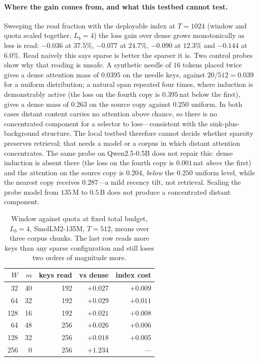 \documentclass[sigconf,nonacm,11pt]{acmart}
\begin{document}
\paragraph{Where the gain comes from, and what this testbed cannot test.} Sweeping the
read fraction with the deployable index at $T=1024$ (window and quota scaled together,
$L_b=4$) the loss gain over dense grows monotonically as less is read: $-0.036$ at
$37.5\%$, $-0.077$ at $24.7\%$, $-0.090$ at $12.3\%$ and $-0.144$ at $6.0\%$. Read
naively this says sparse is better the sparser it is. Two control probes show why that
reading is unsafe. A synthetic needle of $16$ tokens placed twice gives a dense
attention mass of $0.0395$ on the needle keys, against $20/512=0.039$ for a uniform
distribution; a natural span repeated four times, where induction is demonstrably
active (the loss on the fourth copy is $0.395$\,nat below the first), gives a dense
mass of $0.263$ on the source copy against $0.250$ uniform. In both cases distant
content carries no attention above chance, so there is no concentrated component for a
selector to lose---consistent with the sink-plus-background structure. The local
testbed therefore cannot decide whether sparsity preserves retrieval; that needs a
model or a corpus in which distant attention concentrates.
The same probe on Qwen2.5-0.5B does not repair this: dense induction is absent
there (the loss on the fourth copy is $0.001$\,nat \emph{above} the first) and the
attention on the source copy is $0.204$, \emph{below} the $0.250$ uniform level, while
the nearest copy receives $0.287$---a mild recency tilt, not retrieval. Scaling the
probe model from $135$\,M to $0.5$\,B does not produce a concentrated distant
component.

\begin{table}[t]
\centering
\caption{Window against quota at fixed total budget, $L_b=4$, SmolLM2-135M,
$T=512$, means over three corpus chunks. The last row reads more keys than any
sparse configuration and still loses two orders of magnitude more.}
\label{tab:window}
\begin{tabular}{rrrrr}
\toprule
$W$ & $m$ & keys read & vs dense & index cost \\
\midrule
32 & 40 & 192 & $+0.027$ & $+0.009$ \\
64 & 32 & 192 & $+0.029$ & $+0.011$ \\
128 & 16 & 192 & $+0.021$ & $+0.008$ \\
64 & 48 & 256 & $+0.026$ & $+0.006$ \\
128 & 32 & 256 & $+0.018$ & $+0.005$ \\
256 & 0 & 256 & $+1.234$ & --- \\
\bottomrule
\end{tabular}
\end{table}
\end{document}
